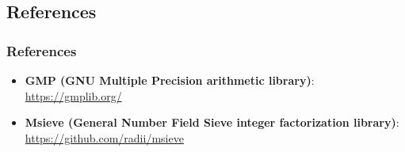 
\subsection{References}

\begin{frame}
\frametitle{References}
\begin{itemize}
\item \textbf{GMP (GNU Multiple Precision arithmetic library)}:
  \url{https://gmplib.org/}
\item \textbf{Msieve (General Number Field Sieve
  integer factorization library)}:
  \url{https://github.com/radii/msieve}
\end{itemize}
\end{frame}

